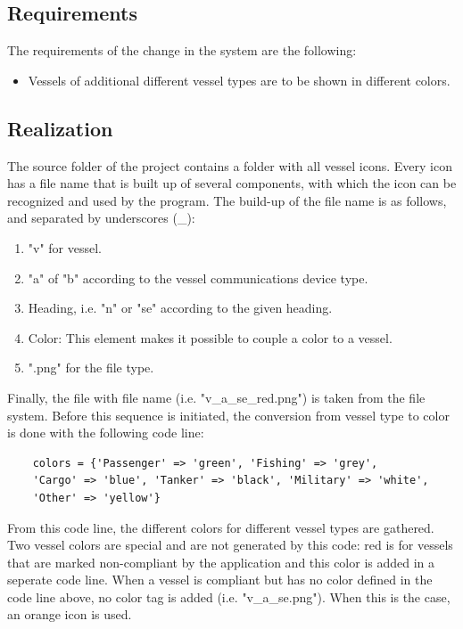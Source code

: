 \documentclass[12pt]{article}
\begin{document}
\subsection*{Requirements}
The requirements of the change in the system are the following:
\begin{itemize}
\item Vessels of additional different vessel types are to be shown in different colors.
\end{itemize}

\subsection*{Realization}
The source folder of the project contains a folder with all vessel icons. Every icon has a file name that is built up of several components, with which the icon can be recognized and used by the program. The build-up of the file name is as follows, and separated by underscores (\_):
\begin{enumerate}
\item "v" for vessel.
\item "a" of "b" according to the vessel communications device type.
\item Heading, i.e. "n" or "se" according to the given heading.
\item Color: This element makes it possible to couple a color to a vessel.
\item ".png" for the file type.
\end{enumerate}

Finally, the file with file name (i.e. "v\_a\_se\_red.png") is taken from the file system. Before this sequence is initiated, the conversion from vessel type to color is done with the following code line:
\begin{verbatim}
    colors = {'Passenger' => 'green', 'Fishing' => 'grey', 
    'Cargo' => 'blue', 'Tanker' => 'black', 'Military' => 'white', 
    'Other' => 'yellow'}
\end{verbatim}

From this code line, the different colors for different vessel types are gathered. Two vessel colors are special and are not generated by this code: red is for vessels that are marked non-compliant by the application and this color is added in a seperate code line. When a vessel is compliant but has no color defined in the code line above, no color tag is added (i.e. "v\_a\_se.png"). When this is the case, an orange icon is used.
\end{document}
